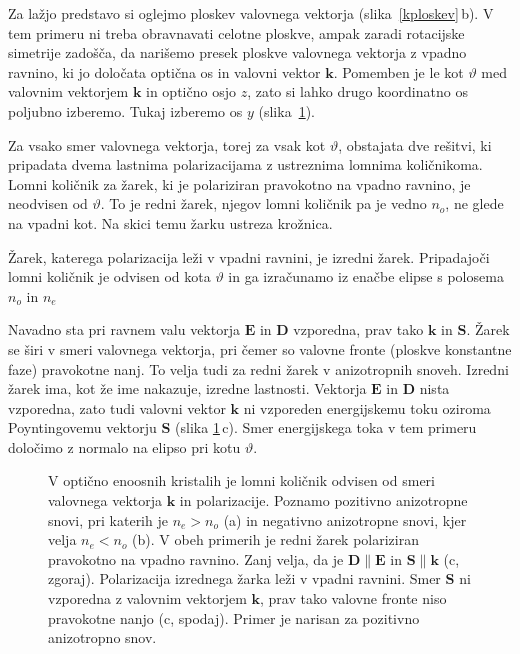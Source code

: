 Za lažjo predstavo si oglejmo ploskev valovnega vektorja (slika~\ref{kploskev}\,b). 
V tem primeru ni treba obravnavati celotne ploskve, ampak zaradi rotacijske simetrije
zadošča, da narišemo presek ploskve valovnega vektorja z vpadno ravnino, ki jo določata 
optična os in valovni vektor $\mathbf{k}$. 
Pomemben je le kot $\vartheta$ med valovnim vektorjem $\mathbf{k}$ 
in optično osjo $z$, zato si lahko drugo koordinatno os poljubno izberemo. Tukaj izberemo
os $y$ (slika~\ref{fig:Elipsa}). 

Za vsako smer valovnega vektorja, torej za vsak kot $\vartheta$, obstajata dve rešitvi, 
ki pripadata dvema lastnima polarizacijama z ustreznima lomnima količnikoma. 
Lomni količnik za žarek, ki je polariziran pravokotno na vpadno ravnino, 
je neodvisen od $\vartheta$. To je redni žarek, njegov lomni količnik 
pa je vedno $n_o$, ne glede na vpadni kot. Na skici temu žarku ustreza krožnica.

Žarek, katerega polarizacija leži v vpadni ravnini, je izredni žarek. Pripadajoči
lomni količnik je odvisen od kota $\vartheta$ in 
ga izračunamo iz enačbe elipse s polosema $n_o$ in $n_e$ 

Navadno sta pri ravnem valu vektorja $\mathbf{E}$ in $\mathbf{D}$ vzporedna, 
prav tako $\mathbf{k}$ in $\mathbf{S}$. Žarek se širi v smeri valovnega vektorja, pri čemer
so valovne fronte (ploskve konstantne faze) pravokotne nanj. To velja tudi za redni žarek v anizotropnih
snoveh. Izredni žarek ima, kot že ime nakazuje, izredne lastnosti. Vektorja
$\mathbf{E}$ in $\mathbf{D}$ nista vzporedna, zato tudi valovni vektor $\mathbf{k}$ ni vzporeden
energijskemu toku oziroma Poyntingovemu vektorju $\mathbf{S}$ (slika \ref{fig:Elipsa}\,c). 
Smer energijskega toka v tem primeru določimo z normalo 
na elipso pri kotu $\vartheta$. 

\begin{figure}[h]
\centering
\def\svgwidth{140truemm} 

\caption{V optično enoosnih kristalih je lomni količnik odvisen
od smeri valovnega vektorja $\mathbf{k}$ in polarizacije. Poznamo pozitivno anizotropne snovi, pri katerih
je $n_e>n_o$ (a) in negativno anizotropne snovi, kjer velja $n_e< n_o$ (b). V obeh primerih je redni 
žarek polariziran pravokotno na vpadno ravnino. Zanj velja, 
da je $\mathbf{D} \parallel \mathbf{E}$ in $\mathbf{S} \parallel \mathbf{k}$ (c, zgoraj). Polarizacija 
izrednega žarka leži v vpadni ravnini. Smer $\mathbf{S}$ ni vzporedna z valovnim vektorjem
$\mathbf{k}$, prav tako valovne fronte niso pravokotne nanjo (c, spodaj). Primer je narisan za pozitivno 
anizotropno snov.}
\label{fig:Elipsa}
\end{figure}
